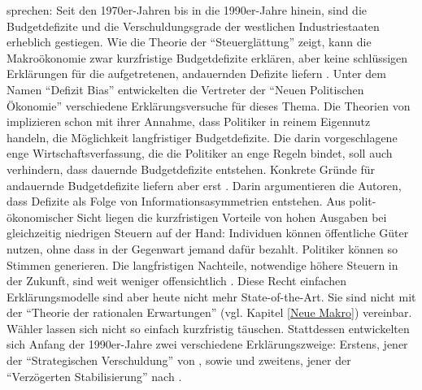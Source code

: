 sprechen: Seit den 1970er-Jahren bis in die 1990er-Jahre hinein, sind die Budgetdefizite und die Verschuldungsgrade der westlichen Industriestaaten erheblich gestiegen.  Wie die Theorie der "`Steuerglättung"' zeigt, kann die Makroökonomie zwar kurzfristige Budgetdefizite erklären, aber keine schlüssigen Erklärungen für die aufgetretenen, andauernden Defizite liefern \parencite{Roubini1989}. Unter dem Namen "`Defizit Bias"' entwickelten die Vertreter der "`Neuen Politischen Ökonomie"' verschiedene Erklärungsversuche für dieses Thema. Die Theorien von \textcite{Buchanan1962} implizieren schon mit ihrer Annahme, dass Politiker in reinem Eigennutz handeln, die Möglichkeit langfristiger Budgetdefizite. Die darin vorgeschlagene enge Wirtschaftsverfassung, die die Politiker an enge Regeln bindet, soll auch verhindern, dass dauernde Budgetdefizite entstehen. Konkrete Gründe für andauernde Budgetdefizite liefern aber erst \textcite{Buchanan1977}. Darin argumentieren die Autoren, dass Defizite als Folge von Informationsasymmetrien entstehen. Aus polit-ökonomischer Sicht liegen die kurzfristigen Vorteile von hohen Ausgaben bei gleichzeitig niedrigen Steuern auf der Hand: Individuen können öffentliche Güter nutzen, ohne dass in der Gegenwart jemand dafür bezahlt. Politiker können so Stimmen generieren. Die langfristigen Nachteile, notwendige höhere Steuern in der Zukunft, sind weit weniger offensichtlich \parencite[S. 679]{Romer2019}. Diese Recht einfachen Erklärungsmodelle sind aber heute nicht mehr State-of-the-Art. Sie sind nicht mit der "`Theorie der rationalen Erwartungen"' (vgl. Kapitel \ref{Neue Makro}) vereinbar. Wähler lassen sich nicht so einfach kurzfristig täuschen. Stattdessen entwickelten sich Anfang der 1990er-Jahre zwei verschiedene Erklärungszweige: Erstens, jener der "`Strategischen Verschuldung"' von \textcite{Persson1989}, sowie \textcite{Alesina1990} und zweitens, jener der "`Verzögerten Stabilisierung"' nach \textcite{Alesina1991}. 

